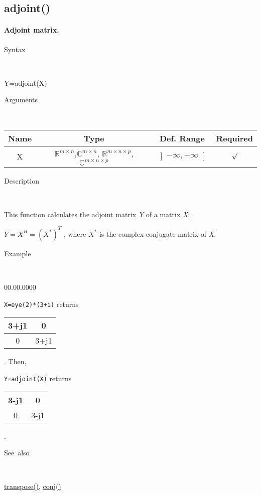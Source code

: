 \subsection*{\hypertarget{adjoint}{}{\Large adjoint()}}


\paragraph{\textmd{\label{par:Adjoint-matrix.}}Adjoint matrix.}

\begin{description}
\item [Syntax]~
\end{description}
Y=adjoint(X)

\begin{description}
\item [Arguments]~
\end{description}
\begin{tabular}{|c|c|c|c|}
\hline 
Name&
Type&
Def. Range&
Required\tabularnewline
\hline
\hline 
X&
$\mathbb{\mathbb{R}}^{m\times n}$,$\mathbb{\mathbb{C}}^{m\times n}$,
$\mathbb{\mathbb{R}}^{m\times n\times p}$, $\mathbb{\mathbb{C}}^{m\times n\times p}$ &
$\left]-\infty,+\infty\right[$&
$\surd$\tabularnewline
\hline
\end{tabular}

\begin{description}
\item [Description]~
\end{description}
This function calculates the adjoint matrix \textit{Y} of a matrix
\textit{X}:

\medskip{}
$Y=X^{H}=\left(X^{*}\right)^{T}$ , where $X^{*}$ is the complex
conjugate matrix of \textit{X}.
\medskip{}

\begin{description}
\item [Example]~
\end{description}
\begin{lyxlist}{00.00.0000}
\item [\texttt{X=eye(2){*}(3+i)}]returns \begin{tabular}{|c|c|}
\hline 
3+j1&
0\tabularnewline
\hline
0&
3+j1\tabularnewline
\hline
\end{tabular}. Then,
\item [\texttt{Y=adjoint(X)}]returns \begin{tabular}{|c|c|}
\hline 
3-j1&
0\tabularnewline
\hline
0&
3-j1\tabularnewline
\hline
\end{tabular}.
\end{lyxlist}
\begin{description}
\item [See~also]~
\end{description}
\textcolor{blue}{\hyperlink{transpose}{transpose()}}, \textcolor{blue}{\hyperlink{conj}{conj()}}



